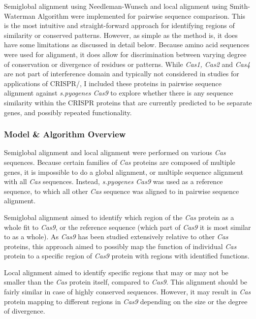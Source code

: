 \documentclass[11pt, oneside]{article}
\begin{document}
Semiglobal alignment using Needleman-Wunsch\cite{needlemanwunsch} and local alignment using Smith-Waterman Algorithm\cite{smithwaterman} were implemented for pairwise sequence comparison. This is the most intuitive and straight-forward approach for identifying regions of similarity or conserved patterns. However, as simple as the method is, it does have some limitations as discussed in detail below. Because amino acid sequences were used for alignment, it does allow for discrimination between varying degree of conservation or divergence of residues or patterns. While \textit{Cas1, Cas2} and \textit{Cas4} are not part of interference domain and typically not considered in studies for applications of CRISPR/, I included these proteins in pairwise sequence alignment against \textit{s.pyogenes Cas9} to explore whether there is any sequence similarity within the CRISPR proteins that are currently predicted to be separate genes, and possibly repeated functionality. 



\subsubsection{Model \& Algorithm Overview}

Semiglobal alignment and local alignment were performed on various \textit{Cas} sequences. Because certain families of \textit{Cas} proteins are composed of multiple genes, it is impossible to do a global alignment, or multiple sequence alignment with all \textit{Cas} sequences. Instead, \textit{s.pyogenes Cas9} was used as a reference sequence, to which all other \textit{Cas} sequence was aligned to in pairwise sequence alignment. 

Semiglobal alignment aimed to identify which region of the \textit{Cas} protein as a whole fit to \textit{Cas9}, or the reference sequence (which part of \textit{Cas9} it is most similar to as a whole). As \textit{Cas9} has been studied extensively relative to other \textit{Cas} proteins, this approach aimed to possibly map the function of individual \textit{Cas} protein to a specific region of \textit{Cas9} protein with regions with identified functions. 

Local alignment aimed to identify specific regions that may or may not be smaller than the \textit{Cas} protein itself, compared to \textit{Cas9}. This alignment should be fairly similar in case of highly conserved sequences. However, it may result in \textit{Cas} protein mapping to different regions in \textit{Cas9} depending on the size or the degree of divergence. 
\end{document}
